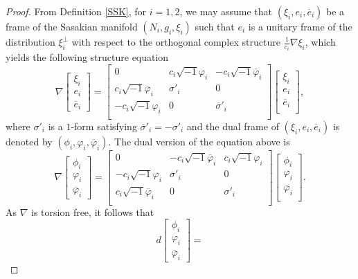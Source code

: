 \documentclass{amsart}
\numberwithin{equation}{section}
\theoremstyle{definition}
\renewcommand{\1}{\mathds{1}}
\renewcommand{\>}{\rightarrow}
\begin{document}
\begin{proof}
From Definition \ref{SSK}, for $i=1,2$, we may assume that $(\xi_i,e_i,\overline{e}_i)$ be a frame of the Sasakian manifold $(N_i, g_i, \xi_i)$ such that $e_i$ is a unitary frame of the distribution $\xi_i^{\bot}$ with respect to the orthogonal complex structure $\frac{1}{c_i} \nabla \xi_i$, which yields the following structure equation
\[ \nabla \! \begin{bmatrix} \xi_i \\ e_i \\ \overline{e}_i \end{bmatrix}=
\begin{bmatrix} 0 & c_i \sqrt{-1} \varphi_i & - c_i \sqrt{-1} \overline{\varphi}_i \\
c_i \sqrt{-1} \overline{\varphi}_i & \sigma'_i & 0  \\
-c_i \sqrt{-1} \varphi_i  & 0 & \overline{\sigma}'_i  \\ \end{bmatrix}\!\!
\begin{bmatrix} \xi_i \\ e_i \\ \overline{e}_i \\ \end{bmatrix}\!\!,\]
where $\sigma'_i$ is a $1$-form satisfying $\overline{\sigma}'_i = - \sigma'_i$ and the dual frame of $(\xi_i,e_i,\overline{e}_i)$ is denoted by $(\phi_i,\varphi_i,\overline{\varphi}_i)$. The dual version of the equation above is
\[ \nabla \! \begin{bmatrix} \phi_i \\ \varphi_i \\ \overline{\varphi}_i \end{bmatrix}=
\begin{bmatrix} 0 & - c_i \sqrt{-1} \overline{\varphi}_i & c_i \sqrt{-1} \varphi_i \\
-c_i \sqrt{-1} \varphi_i & \overline{\sigma}'_i & 0 \\
c_i \sqrt{-1} \overline{\varphi}_i & 0 & \sigma'_i  \\ \end{bmatrix}\!\!
\begin{bmatrix} \phi_i \\ \varphi_i \\ \overline{\varphi}_i \\ \end{bmatrix}\!\!.\]
As $\nabla$ is torsion free, it follows that
\[ d \!  \begin{bmatrix} \phi_i \\ \varphi_i \\ \overline{\varphi}_i \end{bmatrix}=
\]
\end{proof}
\end{document}
